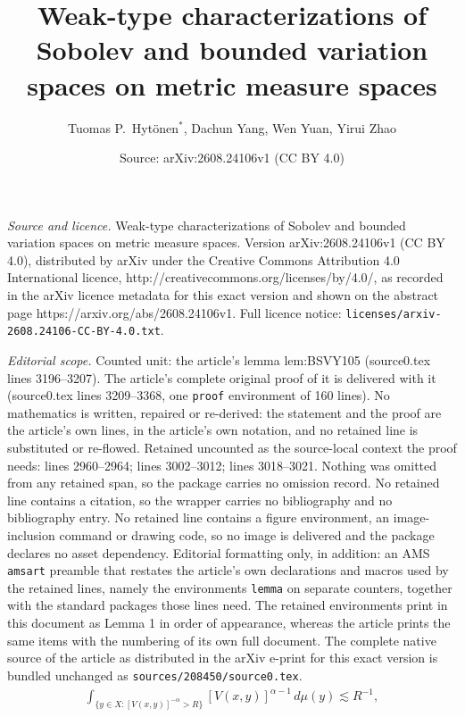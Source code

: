 \documentclass[10pt,a4paper]{amsart}
\title{Weak-type characterizations of Sobolev and bounded variation spaces on metric measure spaces}
\author{Tuomas P.\ Hyt\"onen$^*$, Dachun Yang, Wen Yuan, Yirui Zhao}
\date{Source: arXiv:2608.24106v1 (CC BY 4.0)}
\begin{document}
\maketitle

\noindent\emph{Source and licence.} Weak-type characterizations of Sobolev and bounded variation spaces on metric measure spaces. Version arXiv:2608.24106v1 (CC BY 4.0), distributed by arXiv under the Creative Commons Attribution 4.0 International licence, http://creativecommons.org/licenses/by/4.0/, as recorded in the arXiv licence metadata for this exact version and shown on the abstract page https://arxiv.org/abs/2608.24106v1. Full licence notice: \texttt{licenses/arxiv-2608.24106-CC-BY-4.0.txt}.\par\smallskip

\noindent\textit{Editorial scope.} Counted unit: the article's lemma lem:BSVY105 (source0.tex lines 3196--3207). The article's complete original proof of it is delivered with it (source0.tex lines 3209--3368, one \texttt{proof} environment of 160 lines). No mathematics is written, repaired or re-derived: the statement and the proof are the article's own lines, in the article's own notation, and no retained line is substituted or re-flowed.  Retained uncounted as the source-local context the proof needs: lines 2960--2964; lines 3002--3012; lines 3018--3021.  Nothing was omitted from any retained span, so the package carries no omission record.  No retained line contains a citation, so the wrapper carries no bibliography and no bibliography entry.  No retained line contains a figure environment, an image-inclusion command or drawing code, so no image is delivered and the package declares no asset dependency.  Editorial formatting only, in addition: an AMS \texttt{amsart} preamble that restates the article's own declarations and macros used by the retained lines, namely the environments \texttt{lemma} on separate counters, together with the standard packages those lines need.  The retained environments print in this document as Lemma 1 in order of appearance, whereas the article prints the same items with the numbering of its own full document.  The complete native source of the article as distributed in the arXiv e-print for this exact version is bundled unchanged as \texttt{sources/208450/source0.tex}.
\begin{equation}\label{eq:ele}
\begin{split}
\int_{\{y\in X:[V(x,y)]^{-\alpha}>R\}}[V(x,y)]^{\alpha-1}\,d\mu(y)\lesssim R^{-1},
\end{split}
\end{equation}
\end{document}
